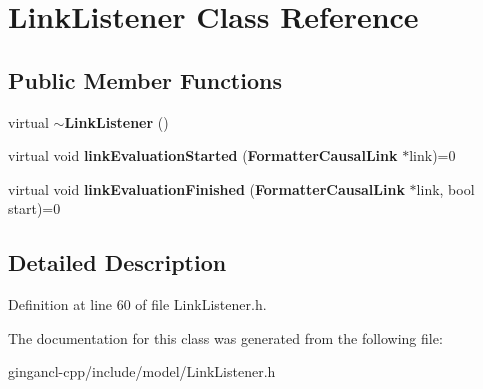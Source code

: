 \section{LinkListener Class Reference}
\label{classbr_1_1pucrio_1_1telemidia_1_1ginga_1_1ncl_1_1model_1_1link_1_1LinkListener}
\subsection*{Public Member Functions}
\begin{CompactItemize}
\item 
virtual {\bf $\sim$LinkListener} ()\label{classbr_1_1pucrio_1_1telemidia_1_1ginga_1_1ncl_1_1model_1_1link_1_1LinkListener_b4d2e6c73cc30a4b72e093896de87546}

\item 
virtual void \textbf{linkEvaluationStarted} ({\bf FormatterCausalLink} $\ast$link)=0\label{classbr_1_1pucrio_1_1telemidia_1_1ginga_1_1ncl_1_1model_1_1link_1_1LinkListener_f9e93a84a254edb09412583d28348a7d}

\item 
virtual void \textbf{linkEvaluationFinished} ({\bf FormatterCausalLink} $\ast$link, bool start)=0\label{classbr_1_1pucrio_1_1telemidia_1_1ginga_1_1ncl_1_1model_1_1link_1_1LinkListener_7470b4514599db473a102285dbdeeb02}

\end{CompactItemize}


\subsection{Detailed Description}




Definition at line 60 of file LinkListener.h.

The documentation for this class was generated from the following file:\begin{CompactItemize}
\item 
gingancl-cpp/include/model/LinkListener.h\end{CompactItemize}
